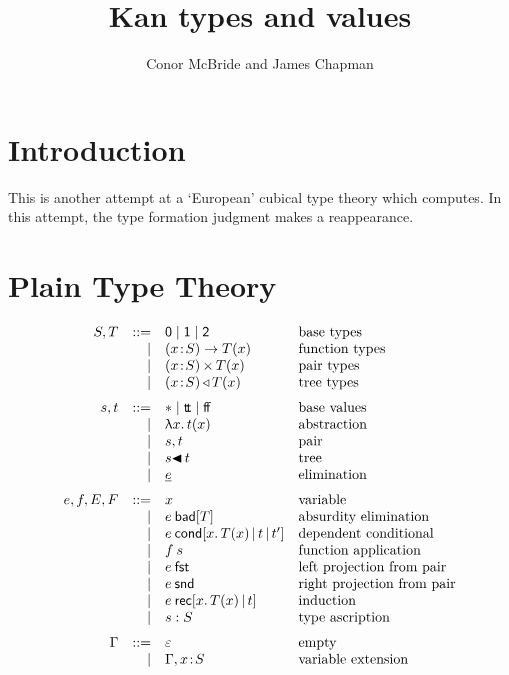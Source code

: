 \documentclass{article}
\newcommand{\hb}{\!:\!}
\newcommand{\ZERO}{\blue{\mathsf{0}}}
\newcommand{\ONE}{\blue{\mathsf{1}}}
\newcommand{\TWO}{\blue{\mathsf{2}}}
\newcommand{\PI}[2]{\blue{(}#1\hb #2\blue{)\to\;}}
\newcommand{\SG}[2]{\blue{(}#1\hb #2\blue{)\,\times\,}}
\newcommand{\WW}[2]{\blue{(}#1\hb #2\blue{)\,\triangleleft\,}}
\newcommand{\void}{\red{\ast}}
\newcommand{\ttt}{\red{\mathsf{t\!t}}}
\newcommand{\fff}{\red{\mathsf{f\!f}}}
\newcommand{\la}[1]{\red{\uplambda}#1.\,}
\newcommand{\pr}{\red{,}\,}
\newcommand{\tr}{\red{\blacktriangleleft}\,}
\newcommand{\el}[1]{\red{\underline{\black{#1}}}}
\newcommand{\fst}{\:\green{\mathsf{fst}}}
\newcommand{\snd}{\:\green{\mathsf{snd}}}
\newcommand{\bad}[1]{\:\green{\mathsf{bad}[}#1\green{]}}
\newcommand{\cond}[4]{\:\green{\mathsf{cond}[}#1.\,#2\green{\,\mid\,}#3\green{\,\mid\,}#4\green{]}}
\newcommand{\ind}[3]{\:\green{\mathsf{rec}[}#1.\,#2\green{\,\mid\,}#3\green{]}}
\begin{document}
\title{Kan types and values}
\author{Conor McBride and James Chapman}
\maketitle

\section{Introduction}

This is another attempt at a `European' cubical type theory which computes.
In this attempt, the type formation judgment makes a reappearance.


\section{Plain Type Theory}

\[\begin{array}{rrll}
S,T     & ::= & \ZERO \;|\; \ONE \;|\; \TWO   & \mbox{base types} \\
        &   | & \PI x S T(x)   & \mbox{function types}\\
        &   | & \SG x S T(x)   & \mbox{pair types}\\
        &   | & \WW x S T(x)   & \mbox{tree types}
\medskip\\
s,t     & ::= & \void \;|\; \ttt \;|\; \fff & \mbox{base values} \\
        &   | & \la x t(x)     & \mbox{abstraction}\\
        &   | & s \pr t        & \mbox{pair} \\
        &   | & s \tr t        & \mbox{tree} \\
        &   | & \el e          & \mbox{elimination}
\medskip\\
e,f,E,F & ::= & x              & \mbox{variable}\\
        &   | & e\bad T        & \mbox{absurdity elimination}\\
        &   | & e\cond x{T(x)}t{t'}    & \mbox{dependent conditional}\\
        &   | & f\:s           & \mbox{function application}\\
        &   | & e\fst          & \mbox{left projection from pair}\\
        &   | & e\snd          & \mbox{right projection from pair}\\
        &   | & e\ind x{T(x)}t    & \mbox{induction}\\
        &   | & s:S            & \mbox{type ascription}
\medskip\\
\Gamma & ::= & \varepsilon   & \mbox{empty} \\
       &   | & \Gamma,x\hb S & \mbox{variable extension} \\
\end{array}\]
\end{document}

